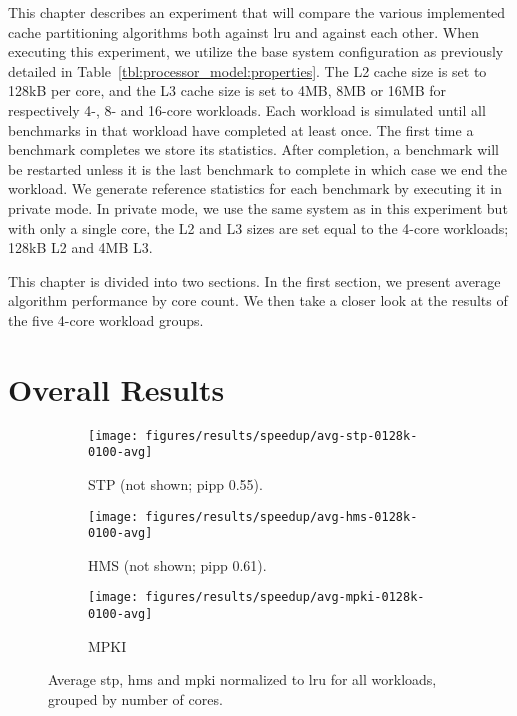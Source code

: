 This chapter describes an experiment that will compare the various implemented cache partitioning algorithms both against \gls{lru} and against each other.
When executing this experiment, we utilize the base system configuration as previously detailed in Table~\ref{tbl:processor_model:properties}.
The L2 cache size is set to 128kB per core, and the L3 cache size is set to 4MB, 8MB or 16MB for respectively 4-, 8- and 16-core workloads.
Each workload is simulated until all benchmarks in that workload have completed at least once. 
The first time a benchmark completes we store its statistics.
After completion, a benchmark will be restarted unless it is the last benchmark to complete in which case we end the workload.
We generate reference statistics for each benchmark by executing it in private mode.
In private mode, we use the same system as in this experiment but with only a single core, the L2 and L3 sizes are set equal to the 4-core workloads; 128kB L2 and 4MB L3.

This chapter is divided into two sections.
In the first section, we present average algorithm performance by core count.
We then take a closer look at the results of the five 4-core workload groups.

\section{Overall Results}
\label{sec:results:cache_partition}

\begin{figure}[th]
    \centering
    \begin{subfigure}[b]{0.5\textwidth}
        \texttt{[image: figures/results/speedup/avg-stp-0128k-0100-avg]}
        \caption{STP (not shown; \gls{pipp} 0.55).}
        \label{fig:results:base:avg:stp}
    \end{subfigure}%
    \begin{subfigure}[b]{0.5\textwidth}
        \texttt{[image: figures/results/speedup/avg-hms-0128k-0100-avg]}
        \caption{HMS (not shown; \gls{pipp} 0.61).}
        \label{fig:results:base:avg:hms}
    \end{subfigure}
    \begin{subfigure}[b]{0.5\textwidth}
        \texttt{[image: figures/results/speedup/avg-mpki-0128k-0100-avg]}
        \caption{MPKI}
        \label{fig:results:base:avg:mpki}
    \end{subfigure}
    \caption[Average result grouped by core]{Average \gls{stp}, \gls{hms} and \gls{mpki} normalized to \gls{lru} for all workloads, grouped by number of cores.}
    \label{fig:results:base:avg}
\end{figure}



